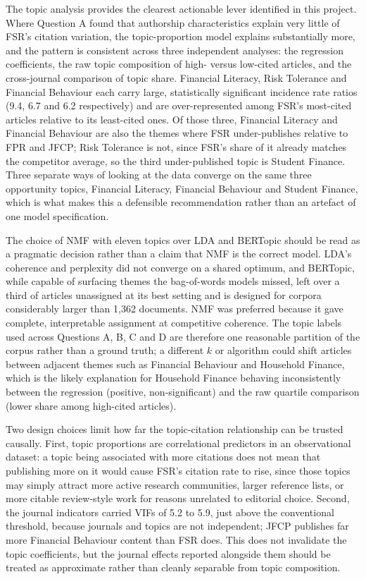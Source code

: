\documentclass[11pt,a4paper]{article}
\begin{document}
The topic analysis provides the clearest actionable lever identified in this project. Where Question A found that authorship characteristics explain very little of FSR's citation variation, the topic-proportion model explains substantially more, and the pattern is consistent across three independent analyses: the regression coefficients, the raw topic composition of high- versus low-cited articles, and the cross-journal comparison of topic share. Financial Literacy, Risk Tolerance and Financial Behaviour each carry large, statistically significant incidence rate ratios (9.4, 6.7 and 6.2 respectively) and are over-represented among FSR's most-cited articles relative to its least-cited ones. Of those three, Financial Literacy and Financial Behaviour are also the themes where FSR under-publishes relative to FPR and JFCP; Risk Tolerance is not, since FSR's share of it already matches the competitor average, so the third under-published topic is Student Finance. Three separate ways of looking at the data converge on the same three opportunity topics, Financial Literacy, Financial Behaviour and Student Finance, which is what makes this a defensible recommendation rather than an artefact of one model specification.

The choice of NMF with eleven topics over LDA and BERTopic should be read as a pragmatic decision rather than a claim that NMF is the correct model. LDA's coherence and perplexity did not converge on a shared optimum, and BERTopic, while capable of surfacing themes the bag-of-words models missed, left over a third of articles unassigned at its best setting and is designed for corpora considerably larger than 1,362 documents. NMF was preferred because it gave complete, interpretable assignment at competitive coherence. The topic labels used across Questions A, B, C and D are therefore one reasonable partition of the corpus rather than a ground truth; a different \(k\) or algorithm could shift articles between adjacent themes such as Financial Behaviour and Household Finance, which is the likely explanation for Household Finance behaving inconsistently between the regression (positive, non-significant) and the raw quartile comparison (lower share among high-cited articles).

Two design choices limit how far the topic-citation relationship can be trusted causally. First, topic proportions are correlational predictors in an observational dataset: a topic being associated with more citations does not mean that publishing more on it would cause FSR's citation rate to rise, since those topics may simply attract more active research communities, larger reference lists, or more citable review-style work for reasons unrelated to editorial choice. Second, the journal indicators carried VIFs of 5.2 to 5.9, just above the conventional threshold, because journals and topics are not independent; JFCP publishes far more Financial Behaviour content than FSR does. This does not invalidate the topic coefficients, but the journal effects reported alongside them should be treated as approximate rather than cleanly separable from topic composition.
\end{document}
